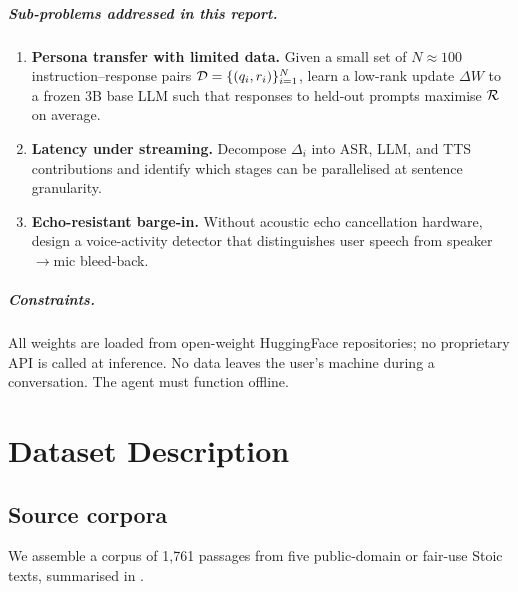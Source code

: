 \documentclass{ecsproject}
\begin{document}
\paragraph{Sub-problems addressed in this report.}
\begin{enumerate}
    \item \textbf{Persona transfer with limited data.} Given a small
    set of $N \approx 100$ instruction--response pairs
    $\mathcal{D} = \{(q_i, r_i)\}_{i=1}^{N}$, learn a low-rank update
    $\Delta W$ to a frozen 3B base LLM such that responses to held-out
    prompts maximise $\mathcal{R}$ on average.
    \item \textbf{Latency under streaming.} Decompose $\Delta_i$ into
    ASR, LLM, and TTS contributions and identify which stages can be
    parallelised at sentence granularity.
    \item \textbf{Echo-resistant barge-in.} Without acoustic echo
    cancellation hardware, design a voice-activity detector that
    distinguishes user speech from speaker$\rightarrow$mic bleed-back.
\end{enumerate}

\paragraph{Constraints.}
All weights are loaded from open-weight HuggingFace repositories; no
proprietary API is called at inference. No data leaves the user's
machine during a conversation. The agent must function offline.

\chapter{Dataset Description} \label{Chapter:Dataset}

\section{Source corpora}
We assemble a corpus of 1{,}761 passages from five public-domain or
fair-use Stoic texts, summarised in .
\end{document}
